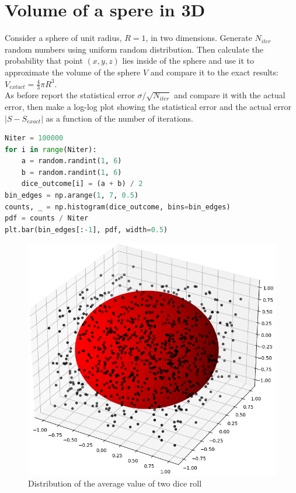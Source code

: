 \documentclass{article}
\begin{document}
\section{Volume of a spere in 3D}
Consider a sphere of unit radius, $R=1$, in two dimensions. Generate $N_{iter}$ random numbers using uniform random distribution. Then calculate the probability that point $(x,y,z)$ lies inside of the sphere and use it to approximate the volume of the sphere $V$ and compare it to the exact results: $V_{extact}=\frac43\pi R^3$.\\
As before report the statistical error $\sigma/\sqrt{N_{iter}}$ and compare it with the actual error, then make a log-log plot showing the statistical error and the actual error $|S-S_{exact}|$ as a function of the number of iterations.
\begin{lstlisting}[language=Python]
Niter = 100000
for i in range(Niter):
    a = random.randint(1, 6)
    b = random.randint(1, 6)
    dice_outcome[i] = (a + b) / 2
bin_edges = np.arange(1, 7, 0.5)
counts, _ = np.histogram(dice_outcome, bins=bin_edges)
pdf = counts / Niter
plt.bar(bin_edges[:-1], pdf, width=0.5)
\end{lstlisting}
\begin{figure}[H]
    \centering
    \includegraphics[width=.9\linewidth]{images/Figure2.png}
    \caption{Distribution of the average value of two dice roll}
    \label{fig:2}
\end{figure}
\clearpage
\end{document}
